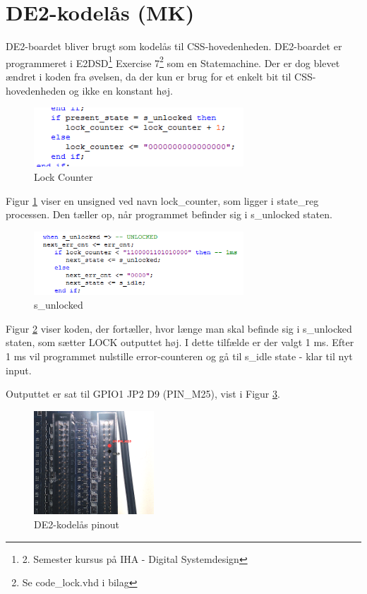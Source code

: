 \section{DE2-kodelås (MK)}

DE2-boardet bliver brugt som kodelås til CSS-hovedenheden. DE2-boardet er programmeret i E2DSD\footnote{2. Semester kursus på IHA - Digital Systemdesign} Exercise 7\footnote{Se code\_lock.vhd i bilag} som en Statemachine. Der er dog blevet ændret i koden fra øvelsen, da der kun er brug for et enkelt bit til CSS-hovedenheden og ikke en konstant høj. 

\begin{figure}[H]
	\centering
	\includegraphics[width=0.70\textwidth]{billeder/HWdesign/code_lock_counter}
	\caption{Lock Counter}
	\label{code:code_lock}
\end{figure}

Figur \ref{code:code_lock} viser en unsigned ved navn lock\_counter, som ligger i state\_reg processen. Den tæller op, når programmet befinder sig i s\_unlocked staten.

\begin{figure}[H]
	\centering
	\includegraphics[width=0.70\textwidth]{billeder/HWdesign/code_lock_s_unlocked_state}
	\caption{s\_unlocked}
	\label{code:s_unlocked}
\end{figure}

Figur \ref{code:s_unlocked} viser koden, der fortæller, hvor længe man skal befinde sig i s\_unlocked staten, som sætter LOCK outputtet høj. I dette tilfælde er der valgt 1 ms. Efter 1 ms vil programmet nulstille error-counteren og gå til s\_idle state - klar til nyt input.

Outputtet er sat til GPIO1 JP2 D9 (PIN\_M25), vist i Figur \ref{code:code_lock_pinout}.

\begin{figure}[H]
	\centering
	\includegraphics[width=0.40\textwidth]{billeder/HWdesign/code_lock_pinout}
	\caption{DE2-kodelås pinout}
	\label{code:code_lock_pinout}
\end{figure}
\newpage
